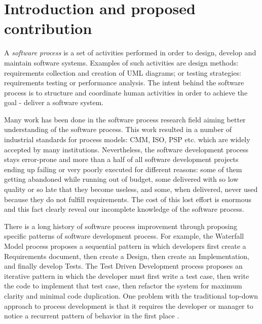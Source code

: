 \chapter{Introduction and proposed contribution}
A \textit{software process} is a set of activities performed in order to design, develop and maintain software systems. Examples of such activities are design methods: requirements collection and creation of UML diagrams; or testing strategies: requirements testing or performance analysis. The intent behind the software process is to structure and coordinate human activities in order to achieve the goal - deliver a software system.

Many work has been done in the software process research field aiming better understanding of the software process. This work resulted in a number of industrial standards for process models: CMM, ISO, PSP etc. \cite{citeulike:5043104} which are widely accepted by many institutions. Nevertheless, the software development process stays error-prone and more than a half of all software development projects ending up failing or very poorly executed for different reasons: some of them getting abandoned while running out of budget, some delivered with so low quality or so late that they become useless, and some, when delivered, never used because they do not fulfill requirements. The cost of this lost effort is enormous and this fact clearly reveal our incomplete knowledge of the software process.

There is a long history of software process improvement through proposing specific patterns of software development process. For example, the Waterfall Model process proposes a sequential pattern in which developers first create a Requirements document, then create a Design, then create an Implementation, and finally develop Tests. The Test Driven Development process proposes an iterative pattern in which the developer must first write a test case, then write the code to implement that test case, then refactor the system for maximum clarity and minimal code duplication. One problem with the traditional top-down approach to process development is that it requires the developer or manager to notice a recurrent pattern of behavior in the first place \cite{citeulike:5043104}. 

